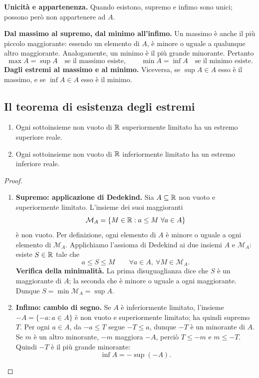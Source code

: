 \textbf{Unicità e appartenenza.} Quando esistono, supremo e infimo sono unici; possono però non appartenere ad $A$.

\textbf{Dal massimo al supremo, dal minimo all'infimo.} Un massimo è anche il più piccolo maggiorante: essendo un elemento di $A$, è minore o uguale a qualunque altro maggiorante. Analogamente, un minimo è il più grande minorante. Pertanto
\[
  \max A=\sup A\quad\text{se il massimo esiste},\qquad
  \min A=\inf A\quad\text{se il minimo esiste}.
\]
\textbf{Dagli estremi al massimo e al minimo.} Viceversa, se $\sup A\in A$ esso è il massimo, e se $\inf A\in A$ esso è il minimo.

\subsection{Il teorema di esistenza degli estremi}

\begin{teorema}
\label{teo:esistenza-estremi}
\begin{enumerate}[label=\arabic*.]
\item Ogni sottoinsieme non vuoto di $\mathbb{R}$ superiormente limitato ha un estremo superiore reale.
\item Ogni sottoinsieme non vuoto di $\mathbb{R}$ inferiormente limitato ha un estremo inferiore reale.
\end{enumerate}
\end{teorema}
\begin{proof}
\begin{enumerate}[label=\arabic*.]
\item \textbf{Supremo: applicazione di Dedekind.} Sia $A\subseteq\mathbb{R}$ non vuoto e superiormente limitato. L'insieme dei suoi maggioranti
\[
  \mathcal M_A=\{M\in\mathbb{R}:a\le M\ \forall a\in A\}
\]
è non vuoto. Per definizione, ogni elemento di $A$ è minore o uguale a ogni elemento di $\mathcal M_A$. Applichiamo l'assioma di Dedekind ai due insiemi $A$ e $\mathcal M_A$: esiste $S\in\mathbb{R}$ tale che
\[
  a\le S\le M\qquad\forall a\in A,\ \forall M\in\mathcal M_A.
\]
\textbf{Verifica della minimalità.} La prima disuguaglianza dice che $S$ è un maggiorante di $A$; la seconda che è minore o uguale a ogni maggiorante. Dunque $S=\min\mathcal M_A=\sup A$.
\item \textbf{Infimo: cambio di segno.} Se $A$ è inferiormente limitato, l'insieme $-A=\{-a:a\in A\}$ è non vuoto e superiormente limitato; ha quindi supremo $T$. Per ogni $a\in A$, da $-a\le T$ segue $-T\le a$, dunque $-T$ è un minorante di $A$. Se $m$ è un altro minorante, $-m$ maggiora $-A$, perciò $T\le-m$ e $m\le-T$. Quindi $-T$ è il più grande minorante:
\[
  \inf A=-\sup(-A).
\]
\end{enumerate}
\end{proof}

